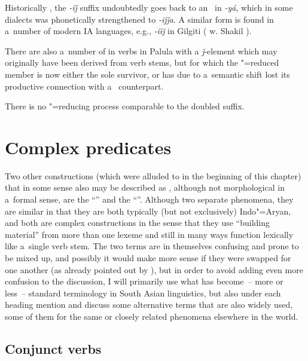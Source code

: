 Historically \citep[316--317]{masica1991}, the \textit{-íǰ} suffix undoubtedly goes back to an~  in \textit{-yá}, which in some  dialects was phonetically strengthened to \textit{-iǰǰa}. A similar form is found in a~number of modern IA languages, e.g., \textit{-íiǰ} in Gilgiti  (\citeauthor{radloffshakil1998} w. Shakil \citeyear[116]{radloffshakil1998}). 



There are also a~number of in verbs in Palula with a \textit{ǰ}-element which may originally have been derived from  verb stems, but for which the "=reduced member is now either the sole survivor, or has due to a~semantic shift lost its productive connection with a~ counterpart.



There is no "=reducing process comparable to the doubled  suffix.


\section{Complex predicates}
\label{sec:8-6}


Two other constructions (which were alluded to in the beginning of this chapter) that in some sense also may be described as , although not morphological in a~formal sense, are the ``'' and the ``''. Although two separate phenomena, they are similar in that they are both typically (but not exclusively) Indo"=Aryan, and both are complex constructions in the sense that they use ``building material'' from more than one lexeme and still in many ways function lexically like a~single verb stem. The two terms are in themselves confusing and prone to be mixed up, and possibly it would make more sense if they were swapped for one another (as already pointed out by \citealt[326]{masica1991}), but in order to avoid adding even more confusion to the discussion, I will primarily use what has become~-- more or less~-- standard terminology in South Asian linguistics, but also under each heading mention and discuss some alternative terms that are also widely used, some of them for the same or closely related phenomena elsewhere in the world.


\subsection{Conjunct verbs}
\label{subsec:8-6-1}

